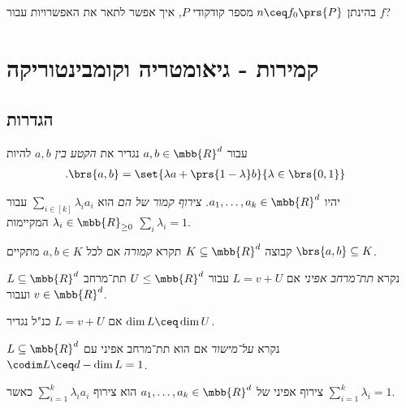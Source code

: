 \documentclass[a4paper,10pt,twoside,openany]{book}
\begin{document}
\begin{question}
בהינתן
$n \ceq f_0\prs{P}$
מספר קודקודי
$P$,
איך אפשר לתאר את האפשרויות עבור
$f$?
\end{question}

\chapter{קמירות - גיאומטריה וקומבינטוריקה}

\section{הגדרות}

\begin{definition}
עבור
$a,b \in \mbb{R}^d$
נגדיר את
\emph{הקטע בין
$a,b$}
להיות
\begin{align*}
\text{.} \brs{a,b} &= \set{\lambda a + \prs{1-\lambda} b}{\lambda \in \brs{0,1}}
\end{align*}
\end{definition}

\begin{definition}
יהיו
$a_1, \ldots, a_k \in \mbb{R}^d$.
\emph{צירוף קמור של הם}
הוא
$\sum_{i \in [k]} \lambda_i a_i$
עבור
$\lambda_i \in \mbb{R}_{\geq 0}$
המקיימות
$\sum_i \lambda_i = 1$.
\end{definition}

\begin{definition}
קבוצה
$K \subseteq \mbb{R}^d$
תקרא
\emph{קמורה}
אם לכל
$a,b \in K$
מתקיים
$\brs{a,b} \subseteq K$.
\end{definition}

\begin{definition}
$L \subseteq \mbb{R}^d$
נקרא
\emph{תת־מרחב אפיני}
אם
$L = v + U$
עבור
$U \leq \mbb{R}^d$
תת־מרחב ועבור
$v \in \mbb{R}^d$.
\end{definition}

\begin{definition}
אם
$L = v + U$
כנ"ל נגדיר
$\dim L \ceq \dim U$.
\end{definition}

\begin{definition}[על־מישור]
$L \subseteq \mbb{R}^d$
נקרא
\emph{על־מישור}
אם הוא תת־מרחב אפיני עם
$\codim L \ceq d - \dim L = 1$.
\end{definition}

\begin{definition}
צירוף אפיני של
$a_1, \ldots, a_k \in \mbb{R}^d$
הוא צירוף
$\sum_{i=1}^k \lambda_i a_i$
כאשר
$\sum_{i=1}^k \lambda_i = 1$.
\end{definition}
\end{document}
